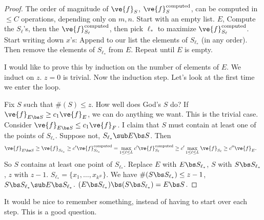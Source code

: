 \begin{proof}
The order of magnitude of $\ve{f}_{S}$, $\ve{f}_S^{\text{computed}}$, can be computed in $\le C$ operations, depending only on $m,n$. %
Start with an empty list. $E$, %
Compute the $S_\ell$'s, then the $\ve{f}_{S_{\ell}}^{\text{computed}}$, then pick $\ell_*$ to maximize $\ve{f}_{S_{\ell}}^{\text{computed}}$.  %
Start writing down $x$'s:
Append to our list the elements of $S_{\ell_*}$ (in any order). Then remove the elements of $S_{\ell_*}$ from $E$.
Repeat until $E$ is empty.

I would like to prove this by induction on the number of elements of $E$.
We induct on $z$. $z=0$ is trivial. Now the induction step. Let's look at the first time we enter the loop. 

Fix $S$ such that $\#(S)\le z$. How well does God's $S$ do? If $\ve{f}_{E\bs S}\ge c_1\ve{f}_E$, we can do anything we want. %
This is the trivial case. 
Consider $\ve{f}_{E\bs S}\le c_1\ve{f}_F$. I claim that $S$ must contain at least one of the points of $S_{\ell_*}$. Suppose not, $S_{\ell_*}\sub E\bs S$. Then
\begin{align}
\ve{f}_{E\bs S} &\ge \ve{f}_{S_{\ell_*}} 
\ge c'\ve{f}_{S_{\ell_*}}^{\text{computed}}
= \max_{1\le \ell \le L}c' \ve{f}_{S_\ell}^{\text{computed}} \ge c'\max_{1\le \ell\le L} \ve{f}_{S_\ell}
\ge c'' \ve{f}_E.
\end{align}
So $S$ contains at least one point of $S_{\ell_*}$. Replace $E$ with $E\bs S_{\ell_*}$, $S$ with $S\bs S_{\ell_*}$, $z$ with $z-1$. 
$S_{\ell_*} = \{x_1,\ldots, x_{k^\#}\}$. %
We have $\#(S\bs S_{\ell_*})\le z-1$, $S\bs S_{\ell_*}\sub E\bs S_{\ell_*}$. 
$(E\bs S_{\ell_*})\bs (S\bs S_{\ell_*}) = E\bs S$. 
\end{proof}
It would be nice to remember something, instead of having to start over each step. This is a good question.
